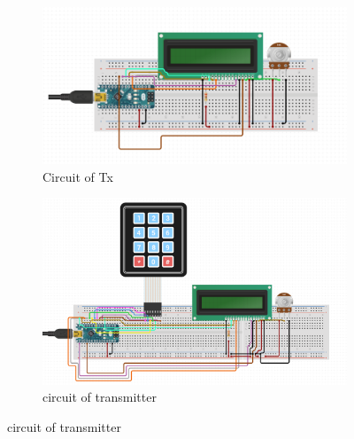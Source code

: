\begin{figure}[h!]
    \centering
    \begin{subfigure}
        \centering
        \includegraphics[width=\textwidth,keepaspectratio]{figures/circuit_rx.png}
        \caption{Circuit of Tx}
        \label{fig:Figure 5}
    \end{subfigure}
    \hfill
    \begin{subfigure}
        \centering
        \includegraphics[width=\textwidth,keepaspectratio]{figures/circuit_tx.png}
        \caption{circuit of transmitter}
        \label{fig:Figure 6}
    \end{subfigure}
    \label{fig:side_by_side_images}
\end{figure}